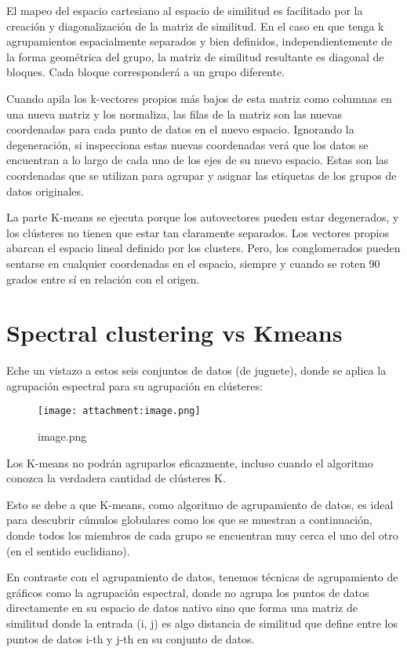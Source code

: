 \documentclass[11pt]{article}
\makeatletter
\def\maxwidth{\ifdim\Gin@nat@width>\linewidth\linewidth
    \else\Gin@nat@width\fi}
\let\Oldincludegraphics\includegraphics
\renewcommand{\includegraphics}[1]{\Oldincludegraphics[width=.8\maxwidth]{#1}}
\makeatother
\begin{document}
El mapeo del espacio cartesiano al espacio de similitud es facilitado
por la creación y diagonalización de la matriz de similitud. En el caso
en que tenga k agrupamientos espacialmente separados y bien definidos,
independientemente de la forma geométrica del grupo, la matriz de
similitud resultante es diagonal de bloques. Cada bloque corresponderá a
un grupo diferente.

Cuando apila los k-vectores propios más bajos de esta matriz como
columnas en una nueva matriz y los normaliza, las filas de la matriz son
las nuevas coordenadas para cada punto de datos en el nuevo espacio.
Ignorando la degeneración, si inspecciona estas nuevas coordenadas verá
que los datos se encuentran a lo largo de cada uno de los ejes de su
nuevo espacio. Estas son las coordenadas que se utilizan para agrupar y
asignar las etiquetas de los grupos de datos originales.

La parte K-means se ejecuta porque los autovectores pueden estar
degenerados, y los clústeres no tienen que estar tan claramente
separados. Los vectores propios abarcan el espacio lineal definido por
los clusters. Pero, los conglomerados pueden sentarse en cualquier
coordenadas en el espacio, siempre y cuando se roten 90 grados entre sí
en relación con el origen.

\section{Spectral clustering vs
Kmeans}\label{spectral-clustering-vs-kmeans}

Eche un vistazo a estos seis conjuntos de datos (de juguete), donde se
aplica la agrupación espectral para su agrupación en clústeres:

\begin{figure}
\centering
\texttt{[image: attachment:image.png]}
\caption{image.png}
\end{figure}

Los K-means no podrán agruparlos eficazmente, incluso cuando el
algoritmo conozca la verdadera cantidad de clústeres K.

Esto se debe a que K-means, como algoritmo de agrupamiento de datos, es
ideal para descubrir cúmulos globulares como los que se muestran a
continuación, donde todos los miembros de cada grupo se encuentran muy
cerca el uno del otro (en el sentido euclidiano).

En contraste con el agrupamiento de datos, tenemos técnicas de
agrupamiento de gráficos como la agrupación espectral, donde no agrupa
los puntos de datos directamente en su espacio de datos nativo sino que
forma una matriz de similitud donde la entrada (i, j) es algo distancia
de similitud que define entre los puntos de datos i-th y j-th en su
conjunto de datos.
\end{document}
